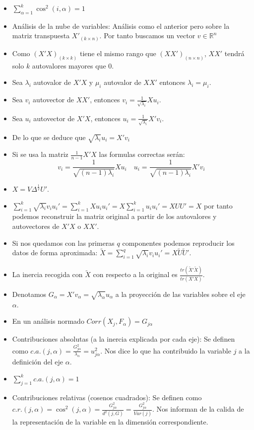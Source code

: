 \documentclass{article}
\begin{document}
\begin{itemize}
    \item $\sum_{\alpha=1}^{k}\cos^2(i,\alpha)=1$
    \item Análisis de la nube de variables: Análisis como el anterior pero sobre la matriz transpuesta $X'_{(k\times n)}$. Por tanto buscamos un vector $v\in\mathbb{R}^n$
    \item Como $(X'X)_{(k\times k)}$ tiene el mismo rango que $(XX')_{(n\times n)}$, $XX'$ tendrá solo $k$ autovalores mayores que 0.
    \item Sea $\lambda_i$ autovalor de $X'X$ y $\mu_i$ autovalor de $XX'$ entonces $\lambda_i = \mu_i$.
    \item Sea $v_i$ autovector de $XX'$, entonces $v_i = \frac{1}{\sqrt{\lambda_i}}Xu_i$.
    \item Sea $u_i$ autovector de $X'X$, entonces $u_i = \frac{1}{\sqrt{\lambda_i}}X'v_i$.
    \item De lo que se deduce que $\sqrt{\lambda_i}u_i = X'v_i$
    \item Si se usa la matriz $\frac{1}{n-1}X'X$ las formulas correctas serán:
          \[v_i=\frac{1}{\sqrt{(n-1)\lambda_i}}Xu_i \quad u_i=\frac{1}{\sqrt{(n-1)\lambda_i}}X'v_i\]
    \item $X=V\Delta^\frac{1}{2}U'$.
    \item $\sum_{i=1}^{k}\sqrt{\lambda_i}v_iu_i'=\sum_{i=1}^{k}Xu_iu_i'=X\sum_{i=1}^{k}u_iu_i'=XUU'=X$ por tanto podemos reconstruir la matriz original a partir de los autovalores y autovectores de $X'X$ o $XX'$.
    \item Si nos quedamos con las primeras $q$ componentes podemos reproducir los datos de forma aproximada: $\tilde{X}=\sum_{i=1}^{q}\sqrt{\lambda_i}v_iu_i'=X\tilde{U}\tilde{U}'$.
    \item La inercia recogida con $\tilde{X}$ con respecto a la original es $\frac{tr(\tilde{X}'\tilde{X})}{tr(X'X)}$.
    \item Denotamos $G_\alpha = X'v_\alpha = \sqrt{\lambda_\alpha}u_\alpha$ a la proyección de las variables sobre el eje $\alpha$.
    \item En un análisis normado $Corr(X_j,F_\alpha)=G_{j\alpha}$
    \item Contribuciones absolutas (a la inercia explicada por cada eje): Se definen como $c.a.(j,\alpha) = \frac{G^2_{j\alpha}}{\lambda_\alpha}=u^2_{j\alpha}$. Nos dice lo que ha contribuido la variable $j$ a la definición del eje $\alpha$.
    \item $\sum_{j=1}^{k}c.a.(j,\alpha)=1$
    \item Contribuciones relativas (cosenos cuadrados): Se definen como $c.r.(j,\alpha)=\cos^2(j,\alpha)=\frac{G^2_{j\alpha}}{d^2(j,G)}=\frac{G^2_{j\alpha}}{Var(j)}$. Nos informan de la calida de la representación de la variable en la dimensión correspondiente.

\end{itemize}
\end{document}

